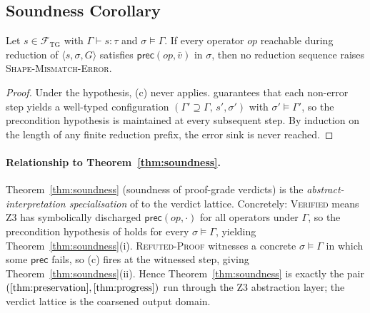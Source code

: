 \subsection{Soundness Corollary}

\begin{corollary}\label{cor:soundness}
Let $s\in\mathcal{F}_{\mathrm{TG}}$ with $\Gamma\vdash s:\tau$ and
$\sigma\models\Gamma$.
If every operator $\mathit{op}$ reachable during reduction of
$\langle s,\sigma,G\rangle$ satisfies $\mathsf{prec}(\mathit{op},\bar v)$
in $\sigma$, then no reduction sequence raises
\textsc{Shape-Mismatch-Error}.
\end{corollary}
\begin{proof}
Under the hypothesis, (c) never applies.
 guarantees that each non-error step yields a
well-typed configuration $(\Gamma'\supseteq\Gamma,\,s',\sigma')$ with
$\sigma'\models\Gamma'$, so the precondition hypothesis is maintained at every
subsequent step.
By induction on the length of any finite reduction prefix, the error sink is
never reached.
\end{proof}

\paragraph{Relationship to Theorem~\ref{thm:soundness}.}
Theorem~\ref{thm:soundness} (soundness of proof-grade verdicts) is the
\emph{abstract-interpretation specialisation} of
 to the verdict lattice.
Concretely: \textsc{Verified} means Z3 has symbolically discharged
$\mathsf{prec}(\mathit{op},\cdot)$ for all operators under $\Gamma$, so the
precondition hypothesis of  holds for every
$\sigma\models\Gamma$, yielding Theorem~\ref{thm:soundness}(i).
\textsc{Refuted-Proof} witnesses a concrete $\sigma\models\Gamma$ in which some
$\mathsf{prec}$ fails, so (c) fires at the witnessed step,
giving Theorem~\ref{thm:soundness}(ii).
Hence Theorem~\ref{thm:soundness} is exactly the pair
$(\Cref{thm:preservation},\Cref{thm:progress})$ run through the Z3 abstraction
layer; the verdict lattice is the coarsened output domain.

